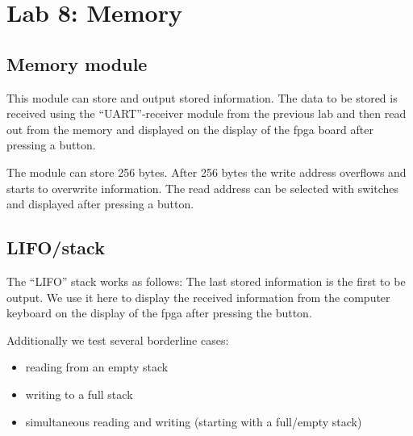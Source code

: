 \chapter{Lab 8: Memory} \label{day8}

\section{Memory module}

This module can store and output stored information. The data to be stored is received using the ``UART''-receiver module from the previous lab and then read out from the memory and displayed on the display of the \gls{fpga} board after pressing a button. 

The module can store 256 bytes. After 256 bytes the write address overflows and starts to overwrite information. The read address can be selected with switches and displayed after pressing a button.





\section{LIFO/stack}

The ``LIFO'' stack works as follows: The last stored information is the first to be output. We use it here to display the received information from the computer keyboard on the display of the \gls{fpga} after pressing the button.







Additionally we test several borderline cases: 

\begin{itemize}
    \item reading from an empty stack
    \item writing to a full stack
    \item simultaneous reading and writing (starting with a full/empty stack)
\end{itemize}

